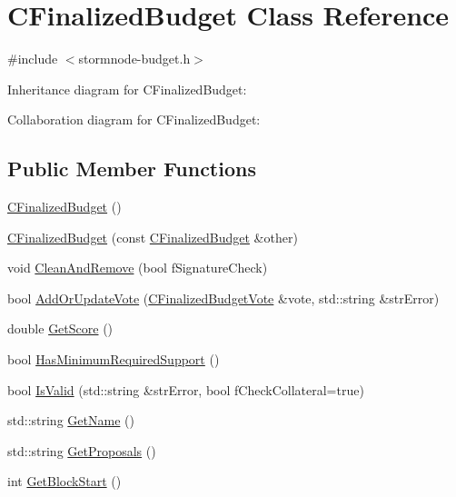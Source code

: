 \hypertarget{class_c_finalized_budget}{}\section{C\+Finalized\+Budget Class Reference}
\label{class_c_finalized_budget}


{\ttfamily \#include $<$stormnode-\/budget.\+h$>$}



Inheritance diagram for C\+Finalized\+Budget\+:


Collaboration diagram for C\+Finalized\+Budget\+:
\subsection*{Public Member Functions}
\begin{DoxyCompactItemize}
\item 
\hyperlink{class_c_finalized_budget_a70a5842e7be58407c5ff5daade0e6e45}{C\+Finalized\+Budget} ()
\item 
\hyperlink{class_c_finalized_budget_a701687a3f6f5dadaa8cf20b188306005}{C\+Finalized\+Budget} (const \hyperlink{class_c_finalized_budget}{C\+Finalized\+Budget} \&other)
\item 
void \hyperlink{class_c_finalized_budget_a11cbbc4f8f84e5ffb2b7257168da98be}{Clean\+And\+Remove} (bool f\+Signature\+Check)
\item 
bool \hyperlink{class_c_finalized_budget_a63fadb286f5d0f9f735bc33deba56b02}{Add\+Or\+Update\+Vote} (\hyperlink{class_c_finalized_budget_vote}{C\+Finalized\+Budget\+Vote} \&vote, std\+::string \&str\+Error)
\item 
double \hyperlink{class_c_finalized_budget_aadcaaf7b39cfe0400253db00c5fe0b03}{Get\+Score} ()
\item 
bool \hyperlink{class_c_finalized_budget_a96b19202f64cb941239a500e7895c048}{Has\+Minimum\+Required\+Support} ()
\item 
bool \hyperlink{class_c_finalized_budget_ae91a3b63f88979a2cf5252b91b9f339d}{Is\+Valid} (std\+::string \&str\+Error, bool f\+Check\+Collateral=true)
\item 
std\+::string \hyperlink{class_c_finalized_budget_adc46e6b0931fd6335d0788311886a1ba}{Get\+Name} ()
\item 
std\+::string \hyperlink{class_c_finalized_budget_a49cb2b919e0de352628d6157cfa1e1c8}{Get\+Proposals} ()
\item 
int \hyperlink{class_c_finalized_budget_adf320ff0b74a982c0aadc5d8a5e168db}{Get\+Block\+Start} ()

\end{DoxyCompactItemize}
